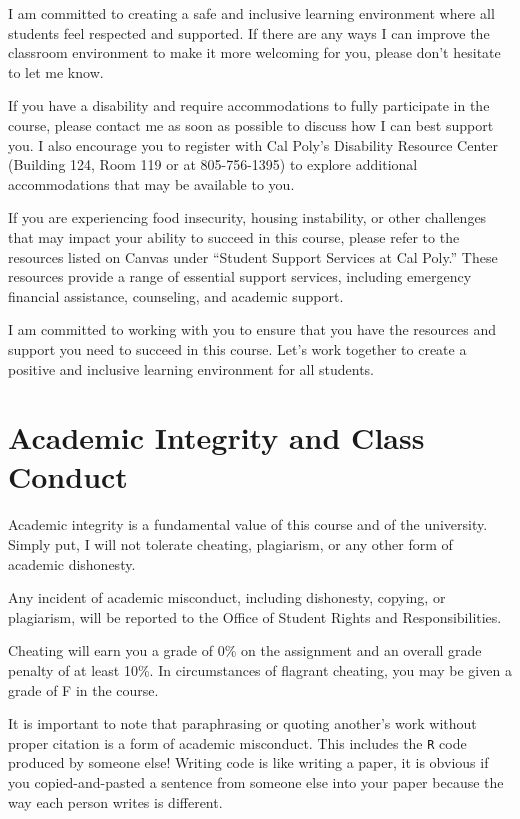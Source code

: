 \documentclass[
  11pt,
  letterpaper,
  DIV=11,
  numbers=noendperiod]{scrartcl}
\begin{document}
I am committed to creating a safe and inclusive learning environment
where all students feel respected and supported. If there are any ways I
can improve the classroom environment to make it more welcoming for you,
please don't hesitate to let me know.

If you have a disability and require accommodations to fully participate
in the course, please contact me as soon as possible to discuss how I
can best support you. I also encourage you to register with Cal Poly's
Disability Resource Center (Building 124, Room 119 or at 805-756-1395)
to explore additional accommodations that may be available to you.

If you are experiencing food insecurity, housing instability, or other
challenges that may impact your ability to succeed in this course,
please refer to the resources listed on Canvas under ``Student Support
Services at Cal Poly.'' These resources provide a range of essential
support services, including emergency financial assistance, counseling,
and academic support.

I am committed to working with you to ensure that you have the resources
and support you need to succeed in this course. Let's work together to
create a positive and inclusive learning environment for all students.

\hypertarget{academic-integrity-and-class-conduct}{%
\section{Academic Integrity and Class
Conduct}\label{academic-integrity-and-class-conduct}}

Academic integrity is a fundamental value of this course and of the
university. Simply put, I will not tolerate cheating, plagiarism, or any
other form of academic dishonesty.

Any incident of academic misconduct, including dishonesty, copying, or
plagiarism, will be reported to the Office of Student Rights and
Responsibilities.

Cheating will earn you a grade of 0\% on the assignment and an overall
grade penalty of at least 10\%. In circumstances of flagrant cheating,
you may be given a grade of F in the course.

It is important to note that paraphrasing or quoting another's work
without proper citation is a form of academic misconduct. This includes
the \texttt{R} code produced by someone else! Writing code is like
writing a paper, it is obvious if you copied-and-pasted a sentence from
someone else into your paper because the way each person writes is
different.
\end{document}
